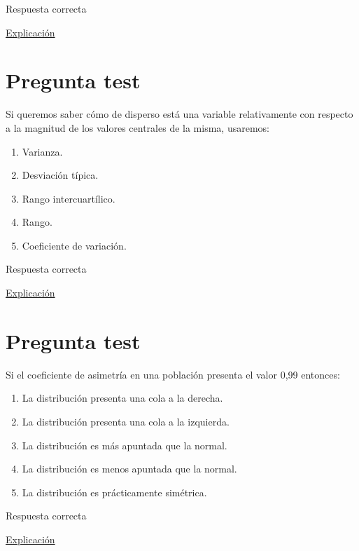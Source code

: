 \documentclass[
]{book}
\providecommand{\tightlist}{%
  \setlength{\itemsep}{0pt}\setlength{\parskip}{0pt}}
\begin{document}
Respuesta correcta

\href{https://1fjmanzano.github.io/bioestadistica/medidas-de-posicio\%CC\%81n-dispersio\%CC\%81n-y-forma.html\#medidas-de-dispersio\%CC\%81n}{Explicación}

\hypertarget{pregunta-test-65}{%
\section{Pregunta test}\label{pregunta-test-65}}

Si queremos saber cómo de disperso está una variable relativamente con respecto a la magnitud de los valores centrales de la misma, usaremos:

\begin{enumerate}
\def\labelenumi{\alph{enumi})}
\tightlist
\item
  Varianza.
\item
  Desviación típica.
\item
  Rango intercuartílico.
\item
  Rango.
\item
  Coeficiente de variación.
\end{enumerate}

Respuesta correcta

\href{https://en.wikipedia.org/wiki/Coefficient_of_variation}{Explicación}

\hypertarget{pregunta-test-66}{%
\section{Pregunta test}\label{pregunta-test-66}}

Si el coeficiente de asimetría en una población presenta el valor 0,99 entonces:

\begin{enumerate}
\def\labelenumi{\alph{enumi})}
\tightlist
\item
  La distribución presenta una cola a la derecha.
\item
  La distribución presenta una cola a la izquierda.
\item
  La distribución es más apuntada que la normal.
\item
  La distribución es menos apuntada que la normal.
\item
  La distribución es prácticamente simétrica.
\end{enumerate}

Respuesta correcta

\href{https://1fjmanzano.github.io/bioestadistica/medidas-de-forma.html}{Explicación}
\end{document}
